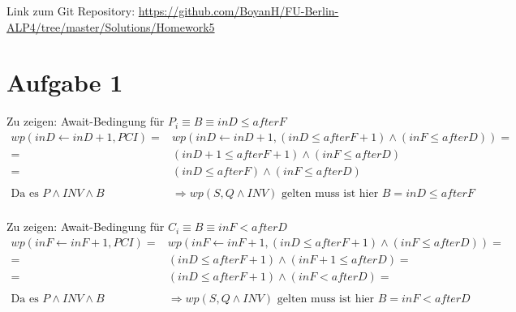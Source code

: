 \usepackage{graphicx}
\usepackage{amsmath}
\usepackage{amssymb}
\usepackage{fancyvrb}

\newcommand{\dozent}{Prof. Dr. Margarita Esponda}					%
\newcommand{\tutor}{Lilli Walter}						%
\newcommand{\tutoriumNo}{6}				%
\newcommand{\projectNo}{5}									%
\newcommand{\veranstaltung}{Nichtsequentielle Programmierung}	%
\newcommand{\semester}{SoeSe 2017}						%
\newcommand{\studenten}{Boyan Hristov, Sergelen Gongor}			%





Link zum Git Repository: \url{https://github.com/BoyanH/FU-Berlin-ALP4/tree/master/Solutions/Homework5}


\section*{Aufgabe 1}

Zu zeigen: Await-Bedingung für $P_i \equiv B \equiv inD \leq afterF$
\begin{align*}
    wp(inD \leftarrow inD + 1, PCI) = & 
    wp(inD \leftarrow inD + 1, (inD \leq afterF + 1) \land (inF \leq afterD)) = \\
    = & (inD+1 \leq afterF + 1) \land (inF \leq afterD) \tag{Zuweisungsregel}\\
    = & (inD \leq afterF) \land (inF \leq afterD) \\ \\
    \text{Da es } P \land INV \land B & \Rightarrow wp(S, Q \land INV) \text{ gelten muss ist hier } B = inD \leq afterF \\
    & \tag*{$\Box$}
\end{align*}

Zu zeigen: Await-Bedingung für $C_i \equiv B \equiv inF < afterD$
\begin{align*}
    wp(inF \leftarrow inF + 1, PCI) = & 
    wp(inF \leftarrow inF + 1, (inD \leq afterF + 1) \land (inF \leq afterD)) = \\
    = & (inD \leq afterF + 1) \land (inF + 1 \leq afterD) = \tag{Zuweisungsregel} \\
    = & (inD \leq afterF + 1) \land (inF < afterD) = \\ \\
    \text{Da es } P \land INV \land B & \Rightarrow wp(S, Q \land INV) \text{ gelten muss ist hier } B = inF < afterD \\
    & \tag*{$\Box$}
\end{align*}

